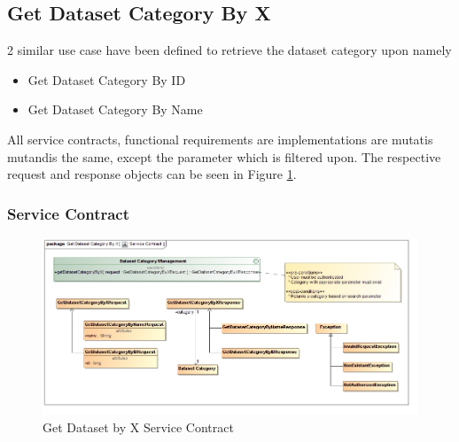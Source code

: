 \subsection {Get Dataset Category By X}
2 similar use case have been defined to retrieve the dataset category upon namely
\begin{itemize}
  \item Get Dataset Category By ID
  \item Get Dataset Category By Name
\end{itemize}

All service contracts, functional requirements are implementations are mutatis 
mutandis the same, except the parameter which is filtered upon. The respective
request and response objects can be seen in 
Figure \ref{fig:getDatasetCategoryByXServiceContract}.
\subsubsection{Service Contract}
\begin{figure}[H]
  \begin{center}
  \includegraphics[scale=0.38]{../Diagrams and Charts/Repository Management/Get Dataset Category By X Service Contract.jpg}
  \caption{Get Dataset by X Service Contract}
  \label{fig:getDatasetCategoryByXServiceContract}
  \end{center}
\end{figure}

